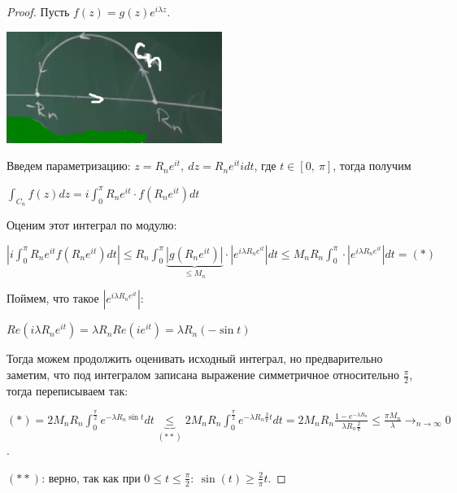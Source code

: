 \begin{proof}
    Пусть $f(z) = g(z) e^{i \lambda z}$.

    \begin{center}
        \includegraphics[width=7cm]{./assets/04-functions-of-complex-variables/Jordan's-lemma-proof.png}
    \end{center}

    Введем параметризацию: $z = R_n e^{i t}, \ dz = R_n e^{it} i dt$, где $t \in [0, \ \pi]$, тогда получим

    $\int_{C_{n}} f(z) dz = i \int_{0}^{\pi} R_n e^{it} \cdot f\left(R_n e^{it}\right) dt$

    Оценим этот интеграл по модулю:

    $\left| i \int_{0}^{\pi} R_n e^{it} f\left(R_n e^{it}\right) dt \right| \leq R_n \int_{0}^{\pi} \underbrace{\left| g\left(R_n e^{it}\right) \right|}_{\leq M_{n}} \cdot \left| e^{i \lambda R_n e^{it}} \right| dt \leq M_n R_n \int_{0}^{\pi} \cdot \left| e^{i \lambda R_n e^{it}} \right| dt = (*)$


    Поймем, что такое $|e^{i \lambda R_n e^{it}}|$:

    $Re\left( i \lambda R_n e^{it} \right) = \lambda R_n Re\left(i e^{it}\right) = \lambda R_n (-\sin{t})$

    Тогда можем продолжить оценивать исходный интеграл, но предварительно заметим, что под интегралом записана выражение симметричное относительно $\frac{\pi}{2}$, тогда переписываем так:

    $(*) = 2 M_n R_n \int_{0}^{\frac{\pi}{2}} e^{-\lambda R_n \sin{t}} dt \underbrace{\leq}_{(**)} 2 M_n R_n \int_{0}^{\frac{\pi}{2}} e^{-\lambda R_n \frac{2}{\pi} t} dt = 2 M_n R_n \frac{1 - e^{-\lambda R_n}}{\lambda R_n \frac{2}{\pi}} \leq \frac{\pi M_n}{\lambda} \rightarrow_{n \to \infty} 0$.

    $(**)$: верно, так как при $0 \leq t \leq \frac{\pi}{2}: \ \sin(t) \geq \frac{2}{\pi} t$.
\end{proof}

